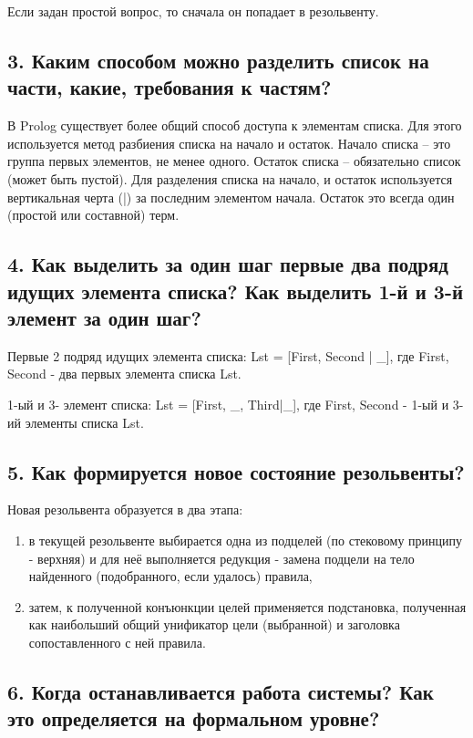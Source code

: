 \documentclass[a4paper,12pt]{article}
\begin{document}
Если задан простой вопрос, то сначала он попадает в резольвенту.

\subsection*{3.	Каким способом можно разделить список на части, какие, требования к частям?}

В Prolog существует более общий способ доступа к элементам списка. Для этого используется метод разбиения списка на начало и остаток. Начало списка – это группа первых элементов, не менее одного. Остаток списка – обязательно список (может быть пустой). Для разделения списка на начало, и остаток используется вертикальная черта (|) за последним элементом начала. Остаток это всегда один (простой или составной) терм. 

\subsection*{4.	Как выделить за один шаг первые два подряд идущих элемента списка? Как выделить 1-й и 3-й элемент за один шаг?}

Первые 2 подряд идущих элемента списка: Lst = [First, Second | \_], где First, Second - два первых элемента списка Lst.

1-ый и 3- элемент списка: Lst = [First, \_, Third|\_], где First, Second - 1-ый и 3-ий элементы списка Lst.

\subsection*{5.	 Как формируется новое состояние резольвенты?}

Новая резольвента образуется в два этапа:
\begin{enumerate}
	\item в текущей резольвенте выбирается одна из подцелей (по стековому принципу - верхняя) и для неё выполняется редукция - замена подцели на тело найденного (подобранного, если удалось) правила,
	\item затем, к полученной конъюнкции целей применяется подстановка, полученная как наибольший общий унификатор цели (выбранной) и заголовка сопоставленного с ней правила.
\end{enumerate}

\subsection*{6.	Когда останавливается работа системы? Как это определяется на формальном уровне?}
\end{document}
